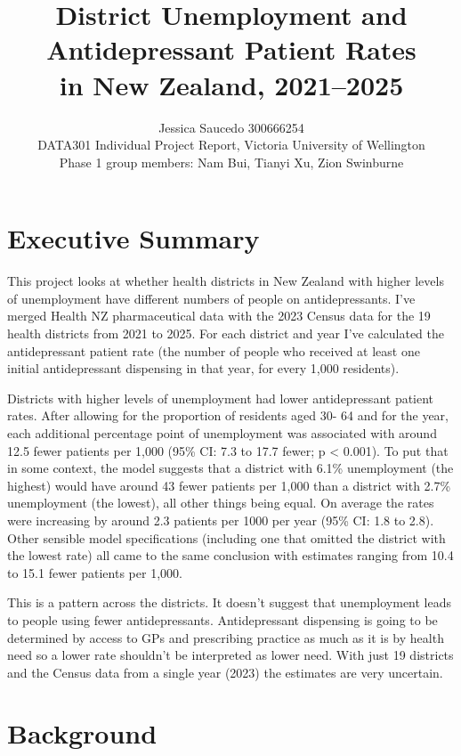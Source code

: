 \documentclass[11pt,a4paper]{article}
\title{District Unemployment and Antidepressant Patient Rates\\in New Zealand, 2021--2025}
\author{Jessica Saucedo 300666254\\[0.3em]
\small DATA301 Individual Project Report, Victoria University of Wellington\\\small Phase 1 group members: Nam Bui, Tianyi Xu, Zion Swinburne}
\date{\tbc{25 Octuber 2026}}
\begin{document}
\maketitle
\section *{Executive Summary}

This project looks at whether health districts in New Zealand with higher levels of unemployment have different numbers of people on antidepressants. I've merged Health NZ pharmaceutical data with the 2023 Census data for the 19 health districts from 2021 to 2025. For each district and year I've calculated the antidepressant patient rate (the number of people who received at least one initial antidepressant dispensing in that year, for every 1,000 residents).

Districts with higher levels of unemployment had lower antidepressant patient rates. After allowing for the proportion of residents aged 30- 64 and for the year, each additional percentage point of unemployment was associated with around 12.5 fewer patients per 1,000 (95\% CI: 7.3 to 17.7 fewer; p < 0.001). To put that in some context, the model suggests that a district with 6.1\% unemployment (the highest) would have around 43 fewer patients per 1,000 than a district with 2.7\% unemployment (the lowest), all other things being equal. On average the rates were increasing by around 2.3 patients per 1000 per year (95\% CI: 1.8 to 2.8). Other sensible model specifications (including one that omitted the district with the lowest rate) all came to the same conclusion with estimates ranging from 10.4 to 15.1 fewer patients per 1,000.

This is a pattern across the districts. It doesn't suggest that unemployment leads to people using fewer antidepressants. Antidepressant dispensing is going to be determined by access to GPs and prescribing practice as much as it is by health need so a lower rate shouldn't be interpreted as lower need. With just 19 districts and the Census data from a single year (2023) the estimates are very uncertain.

\newpage

\section{Background}
\end{document}
